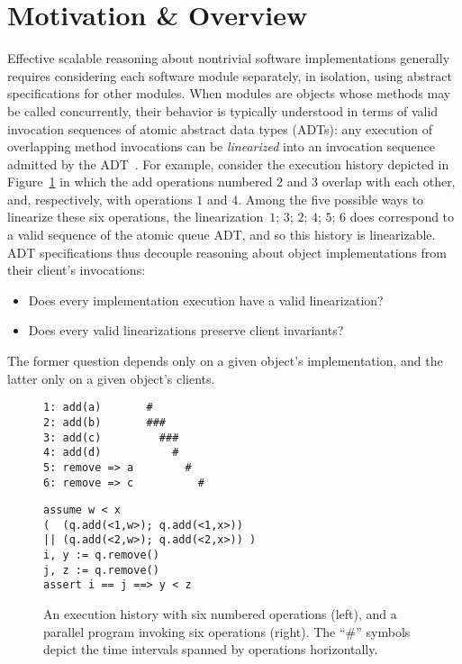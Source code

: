 \section{Motivation \& Overview}
\label{sec:motivation}

Effective scalable reasoning about nontrivial software implementations generally
requires considering each software module separately, in isolation, using
abstract specifications for other modules. When modules are objects whose
methods may be called concurrently, their behavior is typically understood in
terms of valid invocation sequences of atomic abstract data types (ADTs): any
execution of overlapping method invocations can be \emph{linearized} into an
invocation sequence admitted by the ADT~\cite{journals/toplas/HerlihyW90}. For
example, consider the execution history depicted in Figure~\ref{fig:clients} in
which the add operations numbered $2$ and $3$ overlap with each other, and,
respectively, with operations $1$ and $4$. Among the five possible ways to
linearize these six operations, the linearization~$1$; $3$; $2$; $4$; $5$; $6$
does correspond to a valid sequence of the atomic queue ADT, and so this history
is linearizable. ADT specifications thus decouple reasoning about object
implementations from their client’s invocations:
\begin{itemize}

  \item Does every implementation execution have a valid linearization?

  \item Does every valid linearizations preserve client invariants?

\end{itemize}
The former question depends only on a given object’s implementation, and the
latter only on a given object’s clients.

\begin{figure}
  \begin{minipage}{0.43\linewidth}
    \begin{verbatim}
1: add(a)       #
2: add(b)       ###
3: add(c)         ###
4: add(d)           #
5: remove => a        #
6: remove => c          #
    \end{verbatim}
  \end{minipage}
  \hfill
  \begin{minipage}{0.55\linewidth}
    \begin{verbatim}
assume w < x
(  (q.add(<1,w>); q.add(<1,x>))
|| (q.add(<2,w>); q.add(<2,x>)) )
i, y := q.remove()
j, z := q.remove()
assert i == j ==> y < z
    \end{verbatim}
  \end{minipage}
  \caption{An execution history with six numbered operations (left),
    and a parallel program invoking six operations (right). The “\#” symbols
    depict the time intervals spanned by operations horizontally.}
  \label{fig:clients}
\end{figure}

